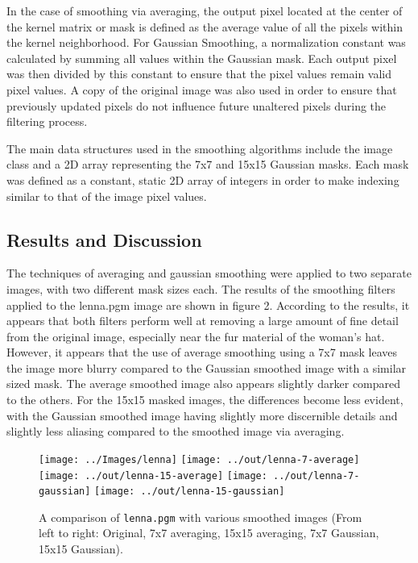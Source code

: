 \documentclass[headings=optiontoheadandtoc,listof=totoc,parskip=full]{scrartcl}
\begin{document}
In the case of smoothing via averaging, the output pixel located at the center of the kernel matrix or mask is defined as the average value of all the pixels within the kernel neighborhood. For Gaussian Smoothing, a normalization constant was calculated by summing all values within the Gaussian mask. Each output pixel was then divided by this constant to ensure that the pixel values remain valid pixel values. A copy of the original image was also used in order to ensure that previously updated pixels do not influence future unaltered pixels during the filtering process.

The main data structures used in the smoothing algorithms include the image class and a 2D array representing the 7x7 and 15x15 Gaussian masks. Each mask was defined as a constant, static 2D array of integers in order to make indexing similar to that of the image pixel values.


\subsection{Results and Discussion}

The techniques of averaging and gaussian smoothing were applied to two separate images, with two different mask sizes each. The results of the smoothing filters applied to the lenna.pgm image are shown in figure 2. According to the results, it appears that both filters perform well at removing a large amount of fine detail from the original image, especially near the fur material of the woman’s hat. However, it appears that the use of average smoothing using a 7x7 mask leaves the image more blurry compared to the Gaussian smoothed image with a similar sized mask. The average smoothed image also appears slightly darker compared to the others. For the 15x15 masked images, the differences become less evident, with the Gaussian smoothed image having slightly more discernible details and slightly less aliasing compared to the smoothed image via averaging. 


\begin{figure}[ht]
	\centering
	\texttt{[image: ../Images/lenna]}
	\texttt{[image: ../out/lenna-7-average]}
	\texttt{[image: ../out/lenna-15-average]}
	\texttt{[image: ../out/lenna-7-gaussian]}
	\texttt{[image: ../out/lenna-15-gaussian]}
	\caption{A comparison of \texttt{lenna.pgm} with various smoothed images (From left to right: Original, 7x7 averaging, 15x15 averaging, 7x7 Gaussian, 15x15 Gaussian).}
	\label{fig:smoothing-result-1}
\end{figure}
\end{document}

